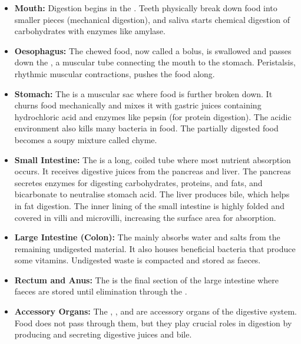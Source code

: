 \begin{itemize}
    \item \textbf{Mouth:} Digestion begins in the . Teeth physically break down food into smaller pieces (mechanical digestion), and saliva starts chemical digestion of carbohydrates with enzymes like amylase. 

    \item \textbf{Oesophagus:}  The chewed food, now called a bolus, is swallowed and passes down the , a muscular tube connecting the mouth to the stomach.  Peristalsis, rhythmic muscular contractions, pushes the food along. 

    \item \textbf{Stomach:}  The  is a muscular sac where food is further broken down.  It churns food mechanically and mixes it with gastric juices containing hydrochloric acid and enzymes like pepsin (for protein digestion). The acidic environment also kills many bacteria in food. The partially digested food becomes a soupy mixture called chyme.

    \item \textbf{Small Intestine:}  The  is a long, coiled tube where most nutrient absorption occurs.  It receives digestive juices from the pancreas and liver.  The pancreas secretes enzymes for digesting carbohydrates, proteins, and fats, and bicarbonate to neutralise stomach acid. The liver produces bile, which helps in fat digestion. The inner lining of the small intestine is highly folded and covered in villi and microvilli, increasing the surface area for absorption. 

    \item \textbf{Large Intestine (Colon):}  The  mainly absorbs water and salts from the remaining undigested material.  It also houses beneficial bacteria that produce some vitamins.  Undigested waste is compacted and stored as faeces.

    \item \textbf{Rectum and Anus:}  The  is the final section of the large intestine where faeces are stored until elimination through the .

    \item \textbf{Accessory Organs:}  The , , and  are accessory organs of the digestive system. Food does not pass through them, but they play crucial roles in digestion by producing and secreting digestive juices and bile.

\end{itemize}

